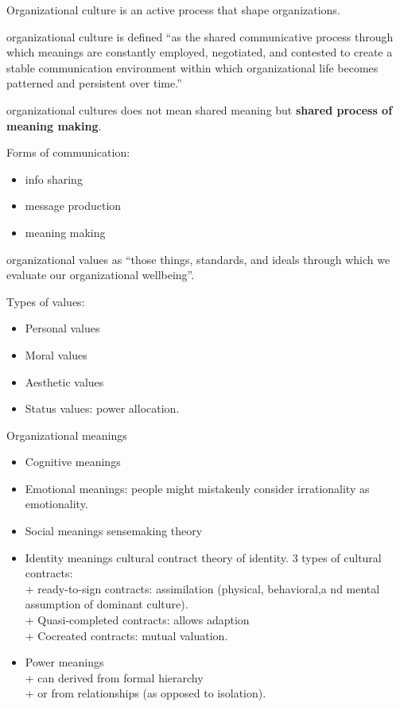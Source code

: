 \documentclass[
]{book}
\providecommand{\tightlist}{%
  \setlength{\itemsep}{0pt}\setlength{\parskip}{0pt}}
\begin{document}
Organizational culture is an active process that shape organizations.

organizational culture is defined ``as the shared communicative process through which meanings are constantly employed, negotiated, and contested to create a stable communication environment within which organizational life becomes patterned and persistent over time.''

organizational cultures does not mean shared meaning but \textbf{shared process of meaning making}.

Forms of communication:

\begin{itemize}
\tightlist
\item
  info sharing\\
\item
  message production\\
\item
  meaning making
\end{itemize}

organizational values as ``those things, standards, and ideals through which we evaluate our organizational wellbeing''.

Types of values:

\begin{itemize}
\tightlist
\item
  Personal values\\
\item
  Moral values\\
\item
  Aesthetic values\\
\item
  Status values: power allocation.
\end{itemize}

Organizational meanings

\begin{itemize}
\tightlist
\item
  Cognitive meanings\\
\item
  Emotional meanings: people might mistakenly consider irrationality as emotionality.\\
\item
  Social meanings sensemaking theory\\
\item
  Identity meanings cultural contract theory of identity. 3 types of cultural contracts:\\
  + ready-to-sign contracts: assimilation (physical, behavioral,a nd mental assumption of dominant culture).\\
  + Quasi-completed contracts: allows adaption\\
  + Cocreated contracts: mutual valuation.\\
\item
  Power meanings\\
  + can derived from formal hierarchy\\
  + or from relationships (as opposed to isolation).
\end{itemize}
\end{document}
